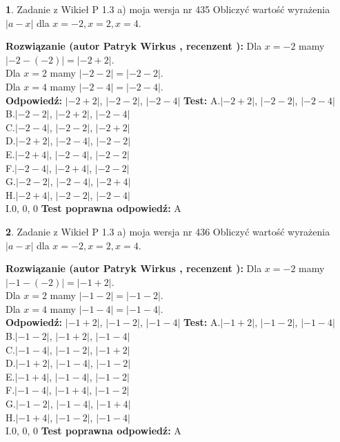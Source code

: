 \documentclass[12pt, a4paper]{article}
\theoremstyle{definition} %
\newtheorem{zad}{}
\newcommand{\zadStart}[1]{\begin{zad}#1\newline}
\newcommand{\zadStop}{\end{zad}}
\newcommand{\rozwStart}[2]{\noindent \textbf{Rozwiązanie (autor #1 , recenzent #2): }\newline}
\newcommand{\rozwStop}{\newline}
\newcommand{\odpStart}{\noindent \textbf{Odpowiedź:}\newline}
\newcommand{\odpStop}{\newline}
\newcommand{\testStart}{\noindent \textbf{Test:}\newline}
\newcommand{\testStop}{\newline}
\newcommand{\kluczStart}{\noindent \textbf{Test poprawna odpowiedź:}\newline}
\newcommand{\kluczStop}{\newline}
\begin{document}
\zadStart{Zadanie z Wikieł P 1.3 a) moja wersja nr 435}
Obliczyć wartość wyrażenia $|a - x|$ dla $x=-2,x=2,x=4$.
\zadStop
\rozwStart{Patryk Wirkus}{}
Dla $x = -2$ mamy $|-2 - (-2)| = |-2 + 2|$.\\
Dla $x = 2$ mamy $|-2 - 2| = |-2 - 2|$.\\
Dla $x = 4$ mamy $|-2 - 4| = |-2 - 4|$.\\
\rozwStop
\odpStart
$|-2 + 2|$, $|-2 - 2|$, $|-2 - 4|$
\odpStop
\testStart
A.$|-2 + 2|$, $|-2 - 2|$, $|-2 - 4|$\\
B.$|-2 - 2|$, $|-2 + 2|$, $|-2 - 4|$\\
C.$|-2 - 4|$, $|-2 - 2|$, $|-2 + 2|$\\
D.$|-2 + 2|$, $|-2 - 4|$, $|-2 - 2|$\\
E.$|-2 + 4|$, $|-2 - 4|$, $|-2 - 2|$\\
F.$|-2 - 4|$, $|-2 + 4|$, $|-2 - 2|$\\
G.$|-2 - 2|$, $|-2 - 4|$, $|-2 + 4|$\\
H.$|-2 + 4|$, $|-2 - 2|$, $|-2 - 4|$\\
I.$0$, $0$, $0$
\testStop
\kluczStart
A
\kluczStop



\zadStart{Zadanie z Wikieł P 1.3 a) moja wersja nr 436}
Obliczyć wartość wyrażenia $|a - x|$ dla $x=-2,x=2,x=4$.
\zadStop
\rozwStart{Patryk Wirkus}{}
Dla $x = -2$ mamy $|-1 - (-2)| = |-1 + 2|$.\\
Dla $x = 2$ mamy $|-1 - 2| = |-1 - 2|$.\\
Dla $x = 4$ mamy $|-1 - 4| = |-1 - 4|$.\\
\rozwStop
\odpStart
$|-1 + 2|$, $|-1 - 2|$, $|-1 - 4|$
\odpStop
\testStart
A.$|-1 + 2|$, $|-1 - 2|$, $|-1 - 4|$\\
B.$|-1 - 2|$, $|-1 + 2|$, $|-1 - 4|$\\
C.$|-1 - 4|$, $|-1 - 2|$, $|-1 + 2|$\\
D.$|-1 + 2|$, $|-1 - 4|$, $|-1 - 2|$\\
E.$|-1 + 4|$, $|-1 - 4|$, $|-1 - 2|$\\
F.$|-1 - 4|$, $|-1 + 4|$, $|-1 - 2|$\\
G.$|-1 - 2|$, $|-1 - 4|$, $|-1 + 4|$\\
H.$|-1 + 4|$, $|-1 - 2|$, $|-1 - 4|$\\
I.$0$, $0$, $0$
\testStop
\kluczStart
A
\kluczStop
\end{document}
